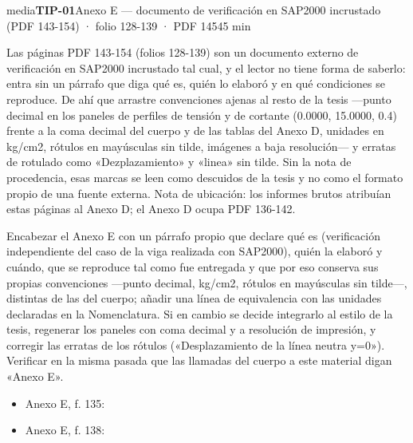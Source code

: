 \begin{ficha}{media}{\casilla\textbf{TIP-01}\quad{}\quad Anexo E — documento de verificación en SAP2000 incrustado (PDF 143-154) · folio 128-139 · PDF 145\hfill 45 min}
\par
{}Las páginas PDF 143-154 (folios 128-139) son un documento externo de verificación en SAP2000 incrustado tal cual, y el lector no tiene forma de saberlo: entra sin un párrafo que diga qué es, quién lo elaboró y en qué condiciones se reproduce. De ahí que arrastre convenciones ajenas al resto de la tesis —punto decimal en los paneles de perfiles de tensión y de cortante (0.0000, 15.0000, 0.4) frente a la coma decimal del cuerpo y de las tablas del Anexo D, unidades en kg/\allowbreak{}cm2, rótulos en mayúsculas sin tilde, imágenes a baja resolución— y erratas de rotulado como «Dezplazamiento» y «linea» sin tilde. Sin la nota de procedencia, esas marcas se leen como descuidos de la tesis y no como el formato propio de una fuente externa. Nota de ubicación: los informes brutos atribuían estas páginas al Anexo D; el Anexo D ocupa PDF 136-142.\par
{}Encabezar el Anexo E con un párrafo propio que declare qué es (verificación independiente del caso de la viga realizada con SAP2000), quién la elaboró y cuándo, que se reproduce tal como fue entregada y que por eso conserva sus propias convenciones —punto decimal, kg/\allowbreak{}cm2, rótulos en mayúsculas sin tilde—, distintas de las del cuerpo; añadir una línea de equivalencia con las unidades declaradas en la Nomenclatura. Si en cambio se decide integrarlo al estilo de la tesis, regenerar los paneles con coma decimal y a resolución de impresión, y corregir las erratas de los rótulos («Desplazamiento de la línea neutra y=0»). Verificar en la misma pasada que las llamadas del cuerpo a este material digan «Anexo E».\par
{}\begin{itemize}[leftmargin=1.2em,itemsep=1pt,topsep=1pt]
\item {\small Anexo E, f. 135: }
\item {\small Anexo E, f. 138: }
\end{itemize}
\end{ficha}
